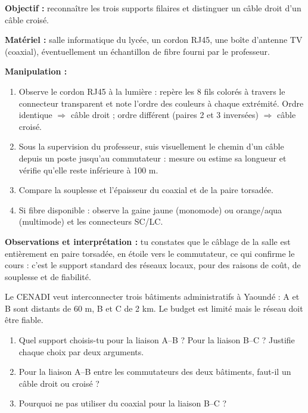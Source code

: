 \documentclass[11pt]{article}
\begin{document}
\begin{experience}
\textbf{Objectif :} reconnaître les trois supports filaires et distinguer un câble droit d'un câble croisé.

\textbf{Matériel :} salle informatique du lycée, un cordon RJ45, une boîte d'antenne TV (coaxial), éventuellement un échantillon de fibre fourni par le professeur.

\textbf{Manipulation :}
\begin{enumerate}
  \item Observe le cordon RJ45 à la lumière : repère les 8 fils colorés à travers le connecteur transparent et note l'ordre des couleurs à chaque extrémité. Ordre identique $\Rightarrow$ câble droit ; ordre différent (paires 2 et 3 inversées) $\Rightarrow$ câble croisé.
  \item Sous la supervision du professeur, suis visuellement le chemin d'un câble depuis un poste jusqu'au commutateur : mesure ou estime sa longueur et vérifie qu'elle reste inférieure à 100 m.
  \item Compare la souplesse et l'épaisseur du coaxial et de la paire torsadée.
  \item Si fibre disponible : observe la gaine jaune (monomode) ou orange/aqua (multimode) et les connecteurs SC/LC.
\end{enumerate}
\textbf{Observations et interprétation :} tu constates que le câblage de la salle est entièrement en paire torsadée, en étoile vers le commutateur, ce qui confirme le cours : c'est le support standard des réseaux locaux, pour des raisons de coût, de souplesse et de fiabilité.
\end{experience}

\begin{exercice}
Le CENADI veut interconnecter trois bâtiments administratifs à Yaoundé : A et B sont distants de 60 m, B et C de 2 km. Le budget est limité mais le réseau doit être fiable.
\begin{enumerate}
  \item Quel support choisis-tu pour la liaison A--B ? Pour la liaison B--C ? Justifie chaque choix par deux arguments.
  \item Pour la liaison A--B entre les commutateurs des deux bâtiments, faut-il un câble droit ou croisé ?
  \item Pourquoi ne pas utiliser du coaxial pour la liaison B--C ?
\end{enumerate}
\end{exercice}
\end{document}
